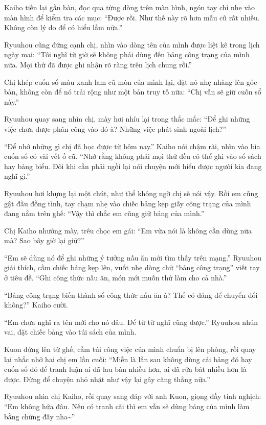 \documentclass[../main.tex]{subfiles}
\begin{document}
Kaiho tiến lại gần bàn, đọc qua từng dòng trên màn hình, ngón tay chỉ nhẹ vào màn hình để kiểm tra các mục: ``Được rồi. Như thế này rõ hơn mẫu cũ rất nhiều. Không còn lý do để có hiểu lầm nữa.''

Ryuuhou cũng đứng cạnh chị, nhìn vào dòng tên của mình được liệt kê trong lịch ngày mai: ``Tôi nghĩ từ giờ sẽ không phải dùng đến bảng công trạng của mình nữa. Mọi thứ đã được ghi nhận rõ ràng trên lịch chung rồi.''

Chị khép cuốn sổ màu xanh lam cũ mòn của mình lại, đặt nó nhẹ nhàng lên góc bàn, không còn để nó trải rộng như một bản truy tố nữa: ``Chị vẫn sẽ giữ cuốn sổ này.''

Ryuuhou quay sang nhìn chị, mày hơi nhíu lại trong thắc mắc: ``Để ghi những việc chưa được phân công vào đó à? Những việc phát sinh ngoài lịch?''

``Để nhớ những gì chị đã học được từ hôm nay.'' Kaiho nói chậm rãi, nhìn vào bìa cuốn sổ có vài vết ố cũ. ``Nhớ rằng không phải mọi thứ đều có thể ghi vào sổ sách hay bảng biểu. Đôi khi cần phải ngồi lại nói chuyện mới hiểu được người kia đang nghĩ gì.''

Ryuuhou hơi khựng lại một chút, như thể không ngờ chị sẽ nói vậy. Rồi em cũng gật đầu đồng tình, tay chạm nhẹ vào chiếc bảng kẹp giấy công trạng của mình đang nằm trên ghế: ``Vậy thì chắc em cũng giữ bảng của mình.''

Chị Kaiho nhướng mày, trêu chọc em gái: ``Em vừa nói là không cần dùng nữa mà? Sao bây giờ lại giữ?''

``Em sẽ dùng nó để ghi những ý tưởng nấu ăn mới tìm thấy trên mạng.'' Ryuuhou giải thích, cầm chiếc bảng kẹp lên, vuốt nhẹ dòng chữ ``bảng công trạng'' viết tay ở tiêu đề. ``Ghi công thức nấu ăn, món mới muốn thử làm cho cả nhà.''

``Bảng công trạng biến thành sổ công thức nấu ăn à? Thế có đáng để chuyển đổi không?'' Kaiho cười.

``Em chưa nghĩ ra tên mới cho nó đâu. Để từ từ nghĩ cũng được.'' Ryuuhou nhún vai, đặt chiếc bảng vào túi sách của mình.

Kuon đứng lên từ ghế, cầm túi công việc của mình chuẩn bị lên phòng, rồi quay lại nhắc nhở hai chị em lần cuối: ``Miễn là lần sau không dùng cái bảng đó hay cuốn sổ đó để tranh luận ai đã lau bàn nhiều hơn, ai đã rửa bát nhiều hơn là được. Đừng để chuyện nhỏ nhặt như vậy lại gây căng thẳng nữa.''

Ryuuhou nhìn chị Kaiho, rồi quay sang đáp với anh Kuon, giọng đầy tinh nghịch: ``Em không hứa đâu. Nếu có tranh cãi thì em vẫn sẽ dùng bảng của mình làm bằng chứng đấy nha\~{}''
\end{document}
